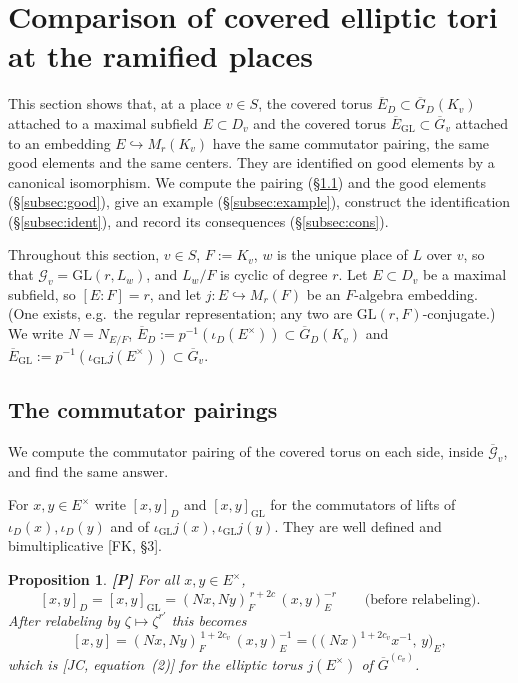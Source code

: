 \documentclass[12pt]{article}
\newcommand{\ov}[1]{\overline{#1}}
\newcommand{\GL}{\mathrm{GL}}
\newcommand{\Gb}{\ov{G}}
\newcommand{\GDb}{\ov{G}_D}
\newcommand{\Eb}{\ov{E}}
\newcommand{\cG}{\mathcal{G}}
\newcommand{\cGb}{\ov{\mathcal{G}}}
\newcommand{\iD}{\iota_D}
\newcommand{\iG}{\iota_{\GL}}
\newcommand{\Pv}{\textbf{[P]}}
\theoremstyle{plain}
\newtheorem{proposition}[theorem]{Proposition}
\theoremstyle{definition}
\begin{document}
\section{Comparison of covered elliptic tori at the ramified places}\label{sec:tori}
This section shows that, at a place $v\in S$, the covered torus $\Eb_D\subset\GDb(K_v)$ attached to a maximal subfield $E\subset D_v$ and the covered torus $\Eb_{\GL}\subset\Gb_v$ attached to an embedding $E\hookrightarrow M_r(K_v)$ have the same commutator pairing, the same good elements and the same centers. They are identified on good elements by a canonical isomorphism. We compute the pairing (\S\ref{subsec:comm}) and the good elements (\S\ref{subsec:good}), give an example (\S\ref{subsec:example}), construct the identification (\S\ref{subsec:ident}), and record its consequences (\S\ref{subsec:cons}).

Throughout this section, $v\in S$, $F:=K_v$, $w$ is the unique place of $L$ over $v$, so that $\cG_v=\GL(r,L_w)$, and $L_w/F$ is cyclic of degree $r$. Let $E\subset D_v$ be a maximal subfield, so $[E:F]=r$, and let $j:E\hookrightarrow M_r(F)$ be an $F$-algebra embedding. (One exists, e.g.\ the regular representation; any two are $\GL(r,F)$-conjugate.) We write $N=N_{E/F}$, $\Eb_D:=p^{-1}(\iD(E^\times))\subset\GDb(K_v)$ and $\Eb_{\GL}:=p^{-1}(\iG j(E^\times))\subset\Gb_v$.

\subsection{The commutator pairings}\label{subsec:comm}
We compute the commutator pairing of the covered torus on each side, inside $\cGb_v$, and find the same answer.

For $x,y\in E^\times$ write $[x,y]_D$ and $[x,y]_{\GL}$ for the commutators of lifts of $\iD(x),\iD(y)$ and of $\iG j(x),\iG j(y)$. They are well defined and bimultiplicative [FK, \S3].

\begin{proposition}\label{prop:comm}\Pv
For all $x,y\in E^\times$,
\begin{equation}\label{eq:commboth}
[x,y]_D=[x,y]_{\GL}=(Nx,Ny)_F^{\,r+2c}\,(x,y)_E^{-r}\qquad\text{(before relabeling)}.
\end{equation}
After relabeling by $\zeta\mapsto\zeta^{r'}$ this becomes
\begin{equation}\label{eq:commrelab}
[x,y]=(Nx,Ny)_F^{\,1+2c_v}\,(x,y)_E^{-1}=\big((Nx)^{1+2c_v}x^{-1},\,y\big)_E,
\end{equation}
which is [JC, equation~(2)] for the elliptic torus $j(E^\times)$ of $\Gb^{(c_v)}$.
\end{proposition}
\end{document}
